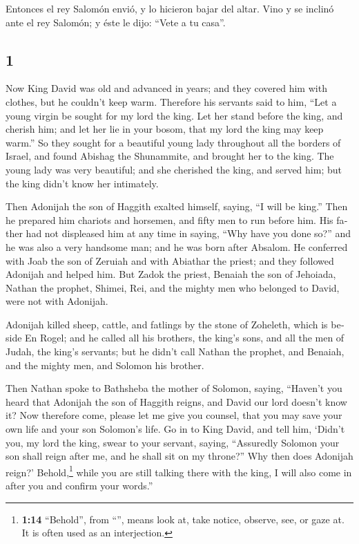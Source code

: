 \begin{paracol}{2}
 Entonces el rey Salomón envió, y lo hicieron bajar del
altar. Vino y se inclinó ante el rey Salomón; y éste le dijo: ``Vete a
tu casa''.

\switchcolumn
\begin{otherlanguage}{english}

\hypertarget{section-1}{%
\section{1}\label{section-1}}

 Now King David was old and advanced in years; and they
covered him with clothes, but he couldn't keep warm. 
Therefore his servants said to him, ``Let a young virgin be sought for
my lord the king. Let her stand before the king, and cherish him; and
let her lie in your bosom, that my lord the king may keep warm.''
 So they sought for a beautiful young lady throughout all
the borders of Israel, and found Abishag the Shunammite, and brought her
to the king.  The young lady was very beautiful; and she
cherished the king, and served him; but the king didn't know her
intimately.

 Then Adonijah the son of Haggith exalted himself, saying,
``I will be king.'' Then he prepared him chariots and horsemen, and
fifty men to run before him.  His father had not
displeased him at any time in saying, ``Why have you done so?'' and he
was also a very handsome man; and he was born after Absalom.
 He conferred with Joab the son of Zeruiah and with
Abiathar the priest; and they followed Adonijah and helped him.
 But Zadok the priest, Benaiah the son of Jehoiada, Nathan
the prophet, Shimei, Rei, and the mighty men who belonged to David, were
not with Adonijah.

 Adonijah killed sheep, cattle, and fatlings by the stone
of Zoheleth, which is beside En Rogel; and he called all his brothers,
the king's sons, and all the men of Judah, the king's servants;
 but he didn't call Nathan the prophet, and Benaiah, and
the mighty men, and Solomon his brother.

 Then Nathan spoke to Bathsheba the mother of Solomon,
saying, ``Haven't you heard that Adonijah the son of Haggith reigns, and
David our lord doesn't know it?  Now therefore come,
please let me give you counsel, that you may save your own life and your
son Solomon's life.  Go in to King David, and tell him,
`Didn't you, my lord the king, swear to your servant, saying,
``Assuredly Solomon your son shall reign after me, and he shall sit on
my throne?'' Why then does Adonijah reign?' 
Behold,\footnote{\textbf{1:14} ``Behold'', from ``'', means
  look at, take notice, observe, see, or gaze at. It is often used as an
  interjection.} while you are still talking there with the king, I will
also come in after you and confirm your words.''


\end{otherlanguage}
\end{paracol}
